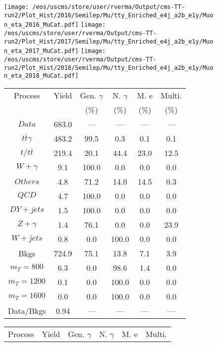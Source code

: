 \begin{figure}
\centering
\texttt{[image: /eos/uscms/store/user/rverma/Output/cms-TT-run2/Plot\_Hist/2016/Semilep/Mu/tty\_Enriched\_e4j\_a2b\_e1y/Muon\_eta\_2016\_MuCat.pdf]}
\texttt{[image: /eos/uscms/store/user/rverma/Output/cms-TT-run2/Plot\_Hist/2017/Semilep/Mu/tty\_Enriched\_e4j\_a2b\_e1y/Muon\_eta\_2017\_MuCat.pdf]}
\texttt{[image: /eos/uscms/store/user/rverma/Output/cms-TT-run2/Plot\_Hist/2018/Semilep/Mu/tty\_Enriched\_e4j\_a2b\_e1y/Muon\_eta\_2018\_MuCat.pdf]}
\begin{minipage}[c]{0.32\textwidth}
\centering
\tiny{
\begin{tabular}{cccccc}
\hline
Process & Yield & Gen. $\gamma$ & N. $\gamma$ & M. e & Multi. \\
 &  & (\%) & (\%) & (\%) & (\%)  \\
\hline
                                                                      $ Data $ &  683.0 &  --- &  --- &  --- &  ---\\
$ t\bar{t}\gamma $ &  483.2 &  99.5 &  0.3 &  0.1 &  0.1\\
$ t/t\bar{t} $ &  219.4 &  20.1 &  44.4 &  23.0 &  12.5\\
$ W+\gamma $ &  9.1 &  100.0 &  0.0 &  0.0 &  0.0\\
$ Others $ &  4.8 &  71.2 &  14.0 &  14.5 &  0.3\\
$ QCD $ &  4.7 &  100.0 &  0.0 &  0.0 &  0.0\\
$ DY+jets $ &  1.5 &  100.0 &  0.0 &  0.0 &  0.0\\
$ Z+\gamma $ &  1.4 &  76.1 &  0.0 &  0.0 &  23.9\\
$ W+jets $ &  0.8 &  0.0 &  100.0 &  0.0 &  0.0\\
Bkgs &  724.9 &  75.1 &  13.8 &  7.1 &  3.9\\
$ m_{T} = 800 $ &  6.3 &  0.0 &  98.6 &  1.4 &  0.0\\
$ m_{T} = 1200 $ &  0.1 &  0.0 &  100.0 &  0.0 &  0.0\\
$ m_{T} = 1600 $ &  0.0 &  0.0 &  100.0 &  0.0 &  0.0\\
Data/Bkgs &  0.94 &  --- &  --- &  --- &  ---\\
\hline
\end{tabular}
}
\end{minipage}
\begin{minipage}[c]{0.32\textwidth}
\centering
\tiny{
\begin{tabular}{cccccc}
\hline
Process & Yield & Gen. $\gamma$ & N. $\gamma$ & M. e & Multi. \\

\end{tabular}}
\end{minipage}
\end{figure}
